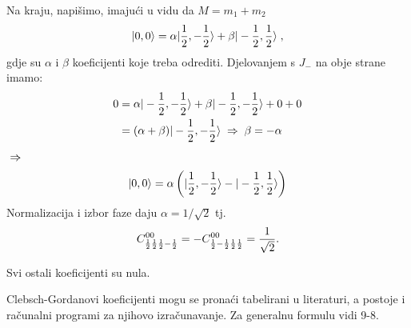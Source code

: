 Na kraju, napišimo, imajući u vidu da $M=m_1+m_2$
\begin{displaymath}
 | 0,0 \rangle = \alpha| \frac{1}{2}, -\frac{1}{2} \rangle+\beta| -\frac{1}{2}, \frac{1}{2} \rangle \;,
\end{displaymath}
gdje su $\alpha$ i $\beta$  koeficijenti koje treba odrediti.
Djelovanjem s $J_-$ na obje strane imamo:
\begin{equation}
\begin{split}
0 &= \alpha| -\frac{1}{2}, -\frac{1}{2} \rangle + \beta| -\frac{1}{2}, -\frac{1}{2} \rangle + 0 + 0\\
&= (\alpha+\beta)| -\frac{1}{2}, -\frac{1}{2} \rangle \;\Rightarrow\; \beta=-\alpha
\end{split}
\end{equation}
$\;\Rightarrow\;$
\begin{displaymath}
   | 0,0 \rangle=\alpha\left(| \frac{1}{2}, -\frac{1}{2} \rangle-| -\frac{1}{2}, \frac{1}{2} \rangle
\right)
\end{displaymath}
Normalizacija i izbor faze daju $\alpha=1/\sqrt{2}$ tj.
\begin{displaymath}
 C^{0 0}_{\frac{1}{2} \frac{1}{2} \frac{1}{2} -\frac{1}{2}}=
 -C^{0 0}_{\frac{1}{2} -\frac{1}{2} \frac{1}{2} \frac{1}{2}}= \frac{1}{\sqrt{2}}.
\end{displaymath}

Svi ostali koeficijenti su nula.

Clebsch-Gordanovi koeficijenti mogu se pronaći tabelirani u literaturi,
a postoje i računalni programi za njihovo izračunavanje. Za
generalnu formulu vidi \cite{Hamermesh:1989} 9-8.
